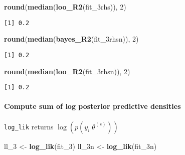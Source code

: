 \documentclass[
]{article}
\newenvironment{Shaded}{\begin{snugshade}}{\end{snugshade}}
\newcommand{\DecValTok}[1]{\textcolor[rgb]{0.00,0.00,0.81}{#1}}
\newcommand{\KeywordTok}[1]{\textcolor[rgb]{0.13,0.29,0.53}{\textbf{#1}}}
\newcommand{\NormalTok}[1]{#1}
\newcommand{\StringTok}[1]{\textcolor[rgb]{0.31,0.60,0.02}{#1}}
\begin{document}
\begin{Shaded}
\begin{Highlighting}[]
\KeywordTok{round}\NormalTok{(}\KeywordTok{median}\NormalTok{(}\KeywordTok{loo_R2}\NormalTok{(fit_3rhs)), }\DecValTok{2}\NormalTok{)}
\end{Highlighting}
\end{Shaded}

\begin{verbatim}
[1] 0.2
\end{verbatim}

\begin{Shaded}
\begin{Highlighting}[]
\KeywordTok{round}\NormalTok{(}\KeywordTok{median}\NormalTok{(}\KeywordTok{bayes_R2}\NormalTok{(fit_3rhsn)), }\DecValTok{2}\NormalTok{)}
\end{Highlighting}
\end{Shaded}

\begin{verbatim}
[1] 0.2
\end{verbatim}

\begin{Shaded}
\begin{Highlighting}[]
\KeywordTok{round}\NormalTok{(}\KeywordTok{median}\NormalTok{(}\KeywordTok{loo_R2}\NormalTok{(fit_3rhsn)), }\DecValTok{2}\NormalTok{)}
\end{Highlighting}
\end{Shaded}

\begin{verbatim}
[1] 0.2
\end{verbatim}

\hypertarget{compute-sum-of-log-posterior-predictive-densities}{%
\paragraph{Compute sum of log posterior predictive
densities}\label{compute-sum-of-log-posterior-predictive-densities}}

\texttt{log\_lik} returns \(\log(p(y_i|\theta^{(s)}))\)

\begin{Shaded}
\begin{Highlighting}[]
\NormalTok{ll_}\DecValTok{3}\NormalTok{ <-}\StringTok{ }\KeywordTok{log_lik}\NormalTok{(fit_}\DecValTok{3}\NormalTok{)}
\NormalTok{ll_3n <-}\StringTok{ }\KeywordTok{log_lik}\NormalTok{(fit_3n)}
\end{Highlighting}
\end{Shaded}
\end{document}
